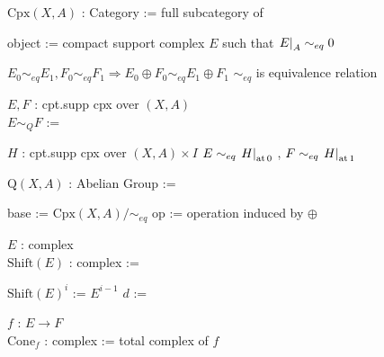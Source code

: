 \documentclass[dvipdfmx]{jsarticle}
\begin{document}
\newcommand{\CpxRelCat}[2]{\text{Cpx}(#1, #2)}
\begin{Definition}
\itemdefi \(\CpxRelCat{X}{A}\) : Category := full subcategory of 
  \begin{itemize}
  \itemenum object := compact support complex \(E\) such that \(\left. {E} \right| _{A} \sim_{eq} 0\)
  \end{itemize}
\end{Definition}

\begin{Theorem}
\itemprop
  \(E_0 \sim_{eq} E_1 , F_0 \sim_{eq} F_1 \Rightarrow E_0 \oplus F_0 \sim_{eq} E_1 \oplus F_1\)
\itemprop
  \(\sim_{eq}\) is equivalence relation
\end{Theorem}

\begin{Definition}
\itemdefi
  \For \(E,F\) : cpt.supp cpx over \((X,A)\) \\
  \Define \(E \sim_{Q} F\) :=
  \begin{itemize}
    \itemenum \(H\) : cpt.supp cpx over \((X,A) \times I\)
    \itemwith \(E \sim_{eq} \left. {H} \right| _{\text{at} \, 0}\) , \(F \sim_{eq} \left. {H} \right| _{\text{at} \, 1}\)
  \end{itemize}
\end{Definition}

\newcommand{\AltDefKth}[1]{\text{Q}(#1)}
\newcommand{\AltDefRelKth}[2]{\text{Q}(#1, #2)}
\begin{Definition}
\itemdefi \(\AltDefRelKth{X}{A}\) : Abelian Group :=
  \begin{itemize}
    \itemenum base := \(\CpxRelCat{X}{A} / \sim_{eq}\) 
    \itemenum op := operation induced by \(\oplus\)
  \end{itemize}
\end{Definition}

\newcommand{\ShiftCpx}[1]{\text{Shift}(#1)}
\begin{Definition}
\itemdefi
  \For \(E\) : complex \\
  \Define \(\ShiftCpx{E}\) : complex := 
  \begin{itemize}
    \itemenum \(\ShiftCpx{E}^i\) := \(E^{i-1}\)
    \itemenum \(d\) := 
  \end{itemize}
\end{Definition}

\newcommand{\MapconeCpx}[1]{\text{Cone}_{#1}}
\begin{Definition}
\itemdefi
  \For \(f\) : \(E \to F\) \\
  \Define \(\MapconeCpx{f}\) : complex := total complex of \(f\)
\end{Definition}
\end{document}
